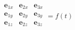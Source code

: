 \documentclass[preview]{standalone}
\begin{document}
\begin{align*}
\begin{matrix}\textbf{e}_{1x}&\textbf{e}_{2x}&\textbf{e}_{3x}\\\textbf{e}_{1y}&\textbf{e}_{2y}&\textbf{e}_{3y}\\\textbf{e}_{1z}&\textbf{e}_{2z}&\textbf{e}_{3z}\\\end{matrix}=f(t)
\end{align*}
\end{document}
